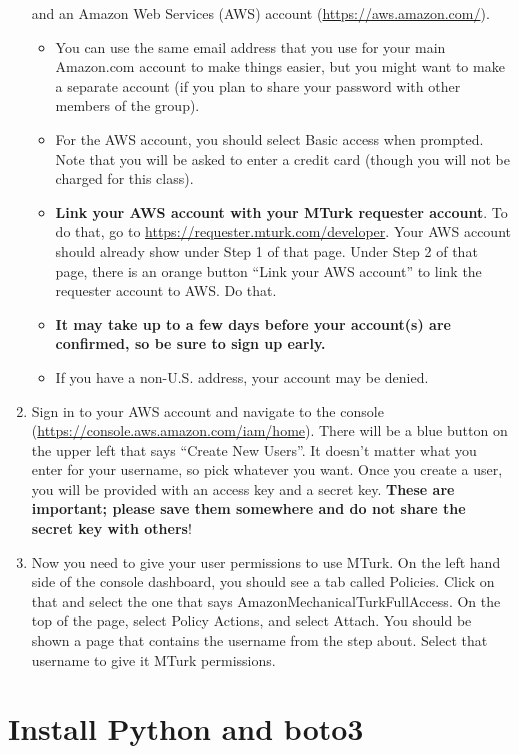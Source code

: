\documentclass{article}
\begin{document}
\begin{enumerate}
    and an Amazon Web Services (AWS) account (\href{https://aws.amazon.com/}{https://aws.amazon.com/}). 
    \begin{itemize}
        \item You can use the same email address that you use for your main Amazon.com account to make things easier, but you might want to make a separate account (if you plan to share your password with other members of the group). 
        \item For the AWS account, you should select Basic access when prompted. Note that you will be asked to enter a credit card (though you will not be charged for this class).
        \item \textbf{Link your AWS account with your MTurk requester account}. To do that, go to \url{https://requester.mturk.com/developer}. Your AWS account should already show under Step 1 of that page. Under Step 2 of that page, there is an orange button ``Link your AWS account'' to link the requester account to AWS. Do that.
        \item \bf{It may take up to a few days before your account(s) are confirmed, so be sure to sign up early}.
        \item If you have a non-U.S. address, your account may be denied. 
    \end{itemize}
    \item Sign in to your AWS account and navigate to the console (\href{https://console.aws.amazon.com/iam/home}{https://console.aws.amazon.com/iam/home}). There will be a blue button on the upper left that says ``Create New Users''. It doesn’t matter what you enter for your username, so pick whatever you want. Once you create a user, you will be provided with an access key and a secret key. \textbf{These are important; please save them somewhere and do not share the secret key with others}!
    \item Now you need to give your user permissions to use MTurk. On the left hand side of the console dashboard, you should see a tab called Policies. Click on that and select the one that says AmazonMechanicalTurkFullAccess. On the top of the page, select Policy Actions, and select Attach. You should be shown a page that contains the username from the step about. Select that username to give it MTurk permissions. 
    
\end{enumerate}

\section{Install Python and boto3}
\end{document}
